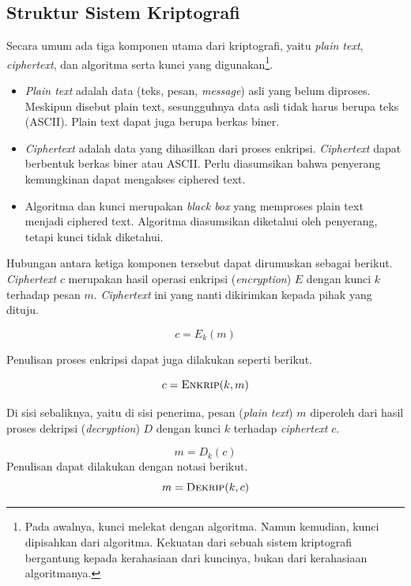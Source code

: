\subsection{Struktur Sistem Kriptografi}
Secara umum ada tiga komponen utama dari kriptografi, yaitu {\em plain text},
{\em ciphertext}, dan algoritma serta kunci yang digunakan\footnote{Pada
awalnya, kunci melekat dengan algoritma. Namun kemudian, kunci dipisahkan dari
algoritma. Kekuatan dari sebuah sistem kriptografi bergantung kepada
kerahasiaan dari kuncinya, bukan dari kerahasiaan algoritmanya.}.
\begin{itemize}
  \item {\em Plain text} adalah data (teks, pesan, {\em message}) asli yang
  belum diproses. Meskipun disebut plain text, sesungguhnya data asli tidak
  harus berupa teks (ASCII). Plain text dapat juga berupa berkas biner.
  \item {\em Ciphertext} adalah data yang dihasilkan dari proses enkripsi.
     {\em Ciphertext} dapat berbentuk berkas biner atau ASCII. Perlu diasumsikan
  bahwa penyerang kemungkinan dapat mengakses ciphered text.
  \item Algoritma dan kunci merupakan {\em black box} yang memproses plain text
  menjadi ciphered text. Algoritma diasumsikan diketahui oleh penyerang,
  tetapi kunci tidak diketahui.
\end{itemize}

Hubungan antara ketiga komponen tersebut dapat dirumuskan sebagai berikut.
{\em Ciphertext} $c$ merupakan hasil operasi enkripsi ({\em encryption}) $E$ 
dengan kunci $k$ terhadap pesan $m$. {\em Ciphertext} ini yang nanti dikirimkan
kepada pihak yang dituju.

\begin{equation}
   c = E_k(m)
\end{equation}

Penulisan proses enkripsi dapat juga dilakukan seperti berikut.

\begin{equation}
   c = \textsc{Enkrip}(k, m)
\end{equation}

Di sisi sebaliknya, yaitu di sisi penerima, pesan ({\em plain text}) $m$
diperoleh dari hasil proses dekripsi ({\em decryption}) $D$ dengan kunci $k$
terhadap {\em ciphertext} $c$. 

\begin{equation}
   m = D_k(c)
\end{equation}
Penulisan dapat dilakukan dengan notasi berikut.
\begin{equation}
   m = \textsc{Dekrip}(k, c)
\end{equation}

